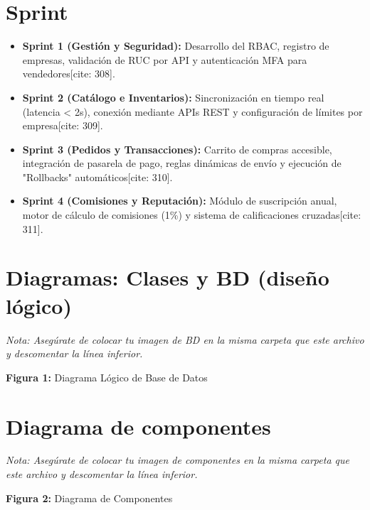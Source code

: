 \documentclass[11pt,a4paper]{report}
\begin{document}
\section{Sprint} %
\begin{itemize}[leftmargin=*]
    \item \textbf{Sprint 1 (Gestión y Seguridad):} Desarrollo del RBAC, registro de empresas, validación de RUC por API y autenticación MFA para vendedores[cite: 308].
    \item \textbf{Sprint 2 (Catálogo e Inventarios):} Sincronización en tiempo real (latencia < 2s), conexión mediante APIs REST y configuración de límites por empresa[cite: 309].
    \item \textbf{Sprint 3 (Pedidos y Transacciones):} Carrito de compras accesible, integración de pasarela de pago, reglas dinámicas de envío y ejecución de "Rollbacks" automáticos[cite: 310].
    \item \textbf{Sprint 4 (Comisiones y Reputación):} Módulo de suscripción anual, motor de cálculo de comisiones (1\%) y sistema de calificaciones cruzadas[cite: 311].
\end{itemize}

\section{Diagramas: Clases y BD (diseño lógico)} %
\textit{Nota: Asegúrate de colocar tu imagen de BD en la misma carpeta que este archivo y descomentar la línea inferior.}
\begin{center}
    \textbf{Figura 1:} Diagrama Lógico de Base de Datos
\end{center}

\section{Diagrama de componentes} %
\textit{Nota: Asegúrate de colocar tu imagen de componentes en la misma carpeta que este archivo y descomentar la línea inferior.}
\begin{center}
    \textbf{Figura 2:} Diagrama de Componentes
\end{center}
\end{document}
